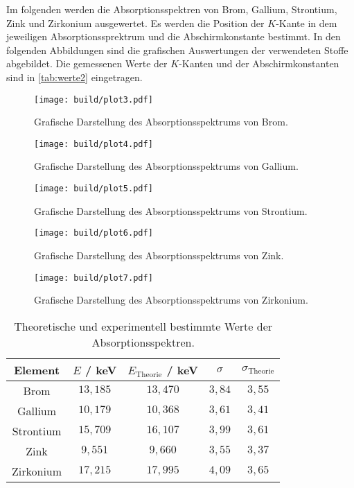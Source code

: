 Im folgenden werden die Absorptionsspektren von Brom, Gallium, Strontium, Zink und Zirkonium ausgewertet.
Es werden die Position der $K$-Kante in dem jeweiligen Absorptionssprektrum und die Abschirmkonstante bestimmt.
In den folgenden Abbildungen sind die grafischen Auswertungen der verwendeten Stoffe abgebildet.
Die gemessenen Werte der $K$-Kanten und der Abschirmkonstanten sind in \autoref{tab:werte2} eingetragen.

\begin{figure}[H]
  \centering
  \texttt{[image: build/plot3.pdf]}
  \caption{Grafische Darstellung des Absorptionsspektrums von Brom.}
  \label{fig:plot3}
\end{figure}

\begin{figure}[H]
  \centering
  \texttt{[image: build/plot4.pdf]}
  \caption{Grafische Darstellung des Absorptionsspektrums von Gallium.}
  \label{fig:plot4}
\end{figure}

\begin{figure}[H]
  \centering
  \texttt{[image: build/plot5.pdf]}
  \caption{Grafische Darstellung des Absorptionsspektrums von Strontium.}
  \label{fig:plot5}
\end{figure}

\begin{figure}[H]
  \centering
  \texttt{[image: build/plot6.pdf]}
  \caption{Grafische Darstellung des Absorptionsspektrums von Zink.}
  \label{fig:plot6}
\end{figure}

\begin{figure}[H]
  \centering
  \texttt{[image: build/plot7.pdf]}
  \caption{Grafische Darstellung des Absorptionsspektrums von Zirkonium.}
  \label{fig:plot7}
\end{figure}


\begin{table}[H]
  \caption{Theoretische und experimentell bestimmte Werte der Absorptionsspektren.}
  \centering
  \label{tab:werte2}
  \begin{tabular}{c| c c c c}
      \toprule
      Element  & $E$ / keV & $E_{\text{Theorie}}$ / keV & $\sigma$ & $\sigma_{\text{Theorie}}$ \\
      \midrule
      Brom      & $13,185$  & $13,470$  & $3,84$ & $3,55$ \\
      Gallium   & $10,179$  & $10,368$  & $3,61$ & $3,41$ \\
      Strontium & $15,709$  & $16,107$  & $3,99$ & $3,61$ \\
      Zink      & $9,551$   & $9,660$   & $3,55$ & $3,37$ \\
      Zirkonium & $17,215$  & $17,995$  & $4,09$ & $3,65$ \\
      \bottomrule
  \end{tabular}
\end{table}

